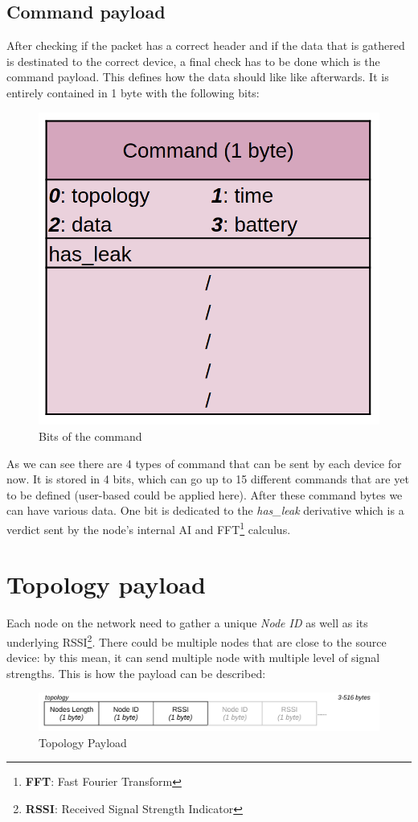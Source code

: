 \documentclass[
	a4paper,
	10pt,
	unnumberedsections,
	twoside,
]{LTJournalArticle}
\begin{document}
\subsection{Command payload}
After checking if the packet has a correct header and if the data that is gathered is destinated to the correct device, a final check has to be done which is the command payload. This defines how the data should like like afterwards. It is entirely contained in 1 byte with the following bits:
\begin{figure}[H]
    \centering
    \includegraphics[width=0.6\linewidth]{img/command_bits.png}
    \caption{Bits of the command}
    \label{fig:command_bits}
\end{figure}
As we can see there are 4 types of command that can be sent by each device for now. It is stored in 4 bits, which can go up to 15 different commands that are yet to be defined (user-based could be applied here). After these command bytes we can have various data. One bit is dedicated to the \textit{has\_leak} derivative which is a verdict sent by the node's internal AI and FFT\footnote{\textbf{FFT}: Fast Fourier Transform} calculus.

\section{Topology payload}\label{sec:topology-payload}
Each node on the network need to gather a unique \textit{Node ID} as well as its underlying RSSI\footnote{\textbf{RSSI}: Received Signal Strength Indicator}. There could be multiple nodes that are close to the source device: by this mean, it can send multiple node with multiple level of signal strengths. This is how the payload can be described:
\begin{figure}[H]
    \centering
    \includegraphics[width=1\linewidth]{img/topology.png}
    \caption{Topology Payload}
    \label{fig:topology}
\end{figure}
\end{document}
